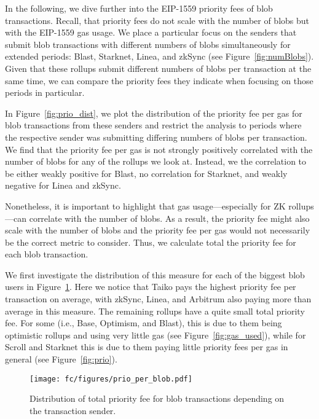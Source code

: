 In the following, we dive further into the EIP-1559 priority fees of blob transactions. Recall, that priority fees do not scale with the number of blobs but with the EIP-1559 gas usage. We place a particular focus on the senders that submit blob transactions with different numbers of blobs simultaneously for extended periods: Blast, Starknet, Linea, and zkSync (see Figure~\ref{fig:numBlobs}). Given that these rollups submit different numbers of blobs per transaction at the same time, we can compare the priority fees they indicate when focusing on those periods in particular. 


In Figure~\ref{fig:prio_dist}, we plot the distribution of the priority fee per gas for blob transactions from these senders and restrict the analysis to periods where the respective sender was submitting differing numbers of blobs per transaction. We find that the priority fee per gas is not strongly positively correlated with the number of blobs for any of the rollups we look at. Instead, we the correlation to be either weakly positive for Blast, no correlation for Starknet, and weakly negative for Linea and zkSync. 












Nonetheless, it is important to highlight that gas usage---especially for ZK rollups---can correlate with the number of blobs. As a result, the priority fee might also scale with the number of blobs and the priority fee per gas would not necessarily be the correct metric to consider. Thus, we calculate total the priority fee for each blob transaction. 

We first investigate the distribution of this measure for each of the biggest blob users in Figure~\ref{fig:total_prio_per_rollup}. Here we notice that Taiko pays the highest priority fee per transaction on average, with zkSync, Linea, and Arbitrum also paying more than average in this measure. The remaining rollups have a quite small total priority fee. For some (i.e., Base, Optimism, and Blast), this is due to them being optimistic rollups and using very little gas (see Figure~\ref{fig:gas_used}), while for Scroll and Starknet this is due to them paying little priority fees per gas in general (see Figure~\ref{fig:prio}).

\begin{figure}[t]
    \centering
    \texttt{[image: fc/figures/prio\_per\_blob.pdf]}
    \caption{Distribution of total priority fee for blob transactions depending on the transaction sender.}
    \label{fig:total_prio_per_rollup}
\end{figure}

